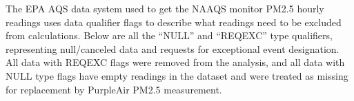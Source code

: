 The EPA AQS data system used to get the NAAQS monitor PM2.5 hourly readings uses data qualifier flags to describe what readings need to be excluded from calculations. Below are all the ``NULL'' and ``REQEXC'' type qualifiers, representing null/canceled data and requests for exceptional event designation. All data with REQEXC flags were removed from the analysis, and all data with NULL type flags have empty readings in the dataset and were treated as missing for replacement by PurpleAir PM2.5 measurement.

